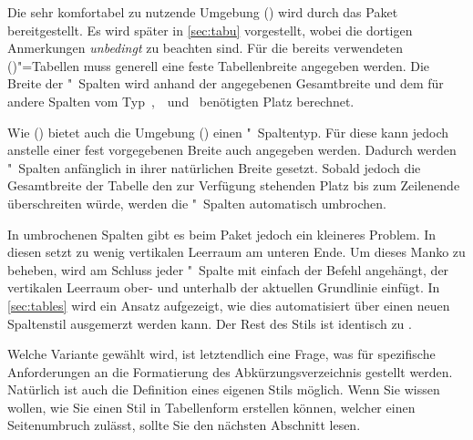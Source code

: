 \documentclass[%
  english,ngerman,%
  cdgeometry=no,DIV=12,%
  cd=false,cdfont=false,cdtitle=true,%
  headings=normal,%
  automark,%
  listof=toc,%
]{tudscrartcl}
\begin{document}
Die sehr komfortabel zu nutzende Umgebung () 
wird durch das Paket  bereitgestellt. Es wird später in 
\autoref{sec:tabu} vorgestellt, wobei die dortigen Anmerkungen \emph{unbedingt} 
zu beachten sind. Für die bereits verwendeten 
()"=Tabellen muss generell eine feste 
Tabellenbreite angegeben werden. Die Breite der "~Spalten wird anhand 
der angegebenen Gesamtbreite und dem für andere Spalten vom 
Typ~,~~und~ benötigten Platz berechnet. 

Wie () bietet auch die Umgebung 
() einen "~Spaltentyp. Für diese kann 
jedoch anstelle einer fest vorgegebenen Breite auch  
angegeben werden. Dadurch werden "~Spalten anfänglich in ihrer 
natürlichen Breite gesetzt. Sobald jedoch die Gesamtbreite der Tabelle den zur 
Verfügung stehenden Platz bis zum Zeilenende überschreiten würde, werden die 
"~Spalten automatisch umbrochen. 

In umbrochenen Spalten gibt es beim Paket  jedoch ein kleineres 
Problem. In diesen setzt  zu wenig vertikalen Leerraum am unteren 
Ende. Um dieses Manko zu beheben, wird am Schluss jeder "~Spalte mit 
 einfach der Befehl  
angehängt, der vertikalen Leerraum ober- und unterhalb der aktuellen Grundlinie 
einfügt. In \autoref{sec:tables} wird ein Ansatz aufgezeigt, wie dies 
automatisiert über einen neuen Spaltenstil ausgemerzt werden kann. Der Rest des 
Stils ist identisch zu .
%
\CodeHook{\let\newglossarystyle\renewglossarystyle}
\begin{Preamble*}

\end{Preamble*}
\begin{Hint}
\printacronyms[style=acrotabu]
\end{Hint}
\begin{quoting}[rightmargin=0pt]
\glsdisablehyper
\InputCode
\end{quoting}
%
Welche Variante gewählt wird, ist letztendlich eine Frage, was für spezifische 
Anforderungen an die Formatierung des Abkürzungsverzeichnis gestellt werden. 
Natürlich ist auch die Definition eines eigenen Stils möglich. Wenn Sie wissen 
wollen, wie Sie einen Stil in Tabellenform erstellen können, welcher einen 
Seitenumbruch zulässt, sollte Sie den nächsten Abschnitt lesen.
\end{document}
